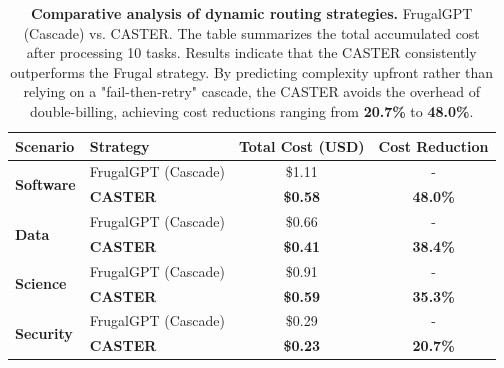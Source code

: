 \documentclass{article}
\theoremstyle{plain}
\theoremstyle{definition}
\theoremstyle{remark}
\begin{document}
\begin{table}[t]
    \centering
    \caption{\textbf{Comparative analysis of dynamic routing strategies.} FrugalGPT (Cascade) vs. CASTER. The table summarizes the total accumulated cost after processing 10 tasks. Results indicate that the CASTER consistently outperforms the Frugal strategy. By predicting complexity upfront rather than relying on a "fail-then-retry" cascade, the CASTER avoids the overhead of double-billing, achieving cost reductions ranging from \textbf{20.7\%} to \textbf{48.0\%}.}
    \label{tab:frugal_vs_neural}
    \begin{tabular}{llcc}
        \toprule
        \textbf{Scenario} & \textbf{Strategy} & \textbf{Total Cost (USD)} & \textbf{Cost Reduction} \\
        \midrule
        \multirow{2}{*}{\textbf{Software}} 
        & FrugalGPT (Cascade) & \$1.11& - \\ 
        & \textbf{CASTER} & \textbf{\$0.58}& \textbf{48.0\%}\\ 
        \midrule
        \multirow{2}{*}{\textbf{Data}} 
        & FrugalGPT (Cascade) & \$0.66& - \\ 
        & \textbf{CASTER} & \textbf{\$0.41}& \textbf{38.4\%}\\ 
        \midrule
        \multirow{2}{*}{\textbf{Science}} 
        & FrugalGPT (Cascade) & \$0.91& - \\ 
        & \textbf{CASTER} & \textbf{\$0.59}& \textbf{35.3\%}\\ 
        \midrule
        \multirow{2}{*}{\textbf{Security}} 
        & FrugalGPT (Cascade) & \$0.29& - \\ 
        & \textbf{CASTER} & \textbf{\$0.23}& \textbf{20.7\%}\\ 
        \bottomrule
    \end{tabular}
\end{table}
\end{document}
